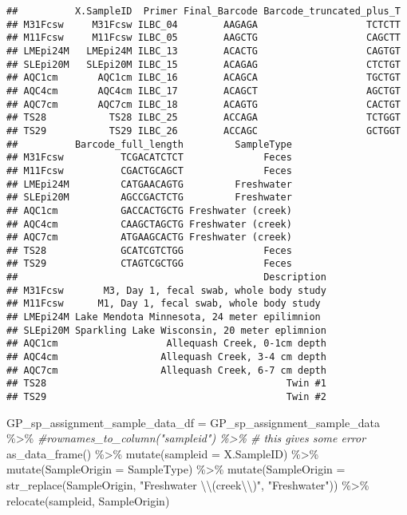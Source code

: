 \documentclass[
]{article}
\newenvironment{Shaded}{\begin{snugshade}}{\end{snugshade}}
\newcommand{\AttributeTok}[1]{\textcolor[rgb]{0.77,0.63,0.00}{#1}}
\newcommand{\CommentTok}[1]{\textcolor[rgb]{0.56,0.35,0.01}{\textit{#1}}}
\newcommand{\FunctionTok}[1]{\textcolor[rgb]{0.00,0.00,0.00}{#1}}
\newcommand{\NormalTok}[1]{#1}
\newcommand{\OtherTok}[1]{\textcolor[rgb]{0.56,0.35,0.01}{#1}}
\newcommand{\SpecialCharTok}[1]{\textcolor[rgb]{0.00,0.00,0.00}{#1}}
\newcommand{\StringTok}[1]{\textcolor[rgb]{0.31,0.60,0.02}{#1}}
\begin{document}
\begin{verbatim}
##          X.SampleID  Primer Final_Barcode Barcode_truncated_plus_T
## M31Fcsw     M31Fcsw ILBC_04        AAGAGA                   TCTCTT
## M11Fcsw     M11Fcsw ILBC_05        AAGCTG                   CAGCTT
## LMEpi24M   LMEpi24M ILBC_13        ACACTG                   CAGTGT
## SLEpi20M   SLEpi20M ILBC_15        ACAGAG                   CTCTGT
## AQC1cm       AQC1cm ILBC_16        ACAGCA                   TGCTGT
## AQC4cm       AQC4cm ILBC_17        ACAGCT                   AGCTGT
## AQC7cm       AQC7cm ILBC_18        ACAGTG                   CACTGT
## TS28           TS28 ILBC_25        ACCAGA                   TCTGGT
## TS29           TS29 ILBC_26        ACCAGC                   GCTGGT
##          Barcode_full_length         SampleType
## M31Fcsw          TCGACATCTCT              Feces
## M11Fcsw          CGACTGCAGCT              Feces
## LMEpi24M         CATGAACAGTG         Freshwater
## SLEpi20M         AGCCGACTCTG         Freshwater
## AQC1cm           GACCACTGCTG Freshwater (creek)
## AQC4cm           CAAGCTAGCTG Freshwater (creek)
## AQC7cm           ATGAAGCACTG Freshwater (creek)
## TS28             GCATCGTCTGG              Feces
## TS29             CTAGTCGCTGG              Feces
##                                           Description
## M31Fcsw       M3, Day 1, fecal swab, whole body study
## M11Fcsw      M1, Day 1, fecal swab, whole body study 
## LMEpi24M Lake Mendota Minnesota, 24 meter epilimnion 
## SLEpi20M Sparkling Lake Wisconsin, 20 meter eplimnion
## AQC1cm                   Allequash Creek, 0-1cm depth
## AQC4cm                  Allequash Creek, 3-4 cm depth
## AQC7cm                  Allequash Creek, 6-7 cm depth
## TS28                                          Twin #1
## TS29                                          Twin #2
\end{verbatim}

\begin{Shaded}
\begin{Highlighting}[]
\NormalTok{GP\_sp\_assignment\_sample\_data\_df }\OtherTok{=}\NormalTok{ GP\_sp\_assignment\_sample\_data }\SpecialCharTok{\%\textgreater{}\%}
  \CommentTok{\#rownames\_to\_column("sampleid")  \%\textgreater{}\% \# this gives some error}
  \FunctionTok{as\_data\_frame}\NormalTok{() }\SpecialCharTok{\%\textgreater{}\%}
 \FunctionTok{mutate}\NormalTok{(}\AttributeTok{sampleid =}\NormalTok{ X.SampleID) }\SpecialCharTok{\%\textgreater{}\%}
 \FunctionTok{mutate}\NormalTok{(}\AttributeTok{SampleOrigin =}\NormalTok{ SampleType) }\SpecialCharTok{\%\textgreater{}\%}
  \FunctionTok{mutate}\NormalTok{(}\AttributeTok{SampleOrigin =} \FunctionTok{str\_replace}\NormalTok{(SampleOrigin, }\StringTok{"Freshwater }\SpecialCharTok{\textbackslash{}\textbackslash{}}\StringTok{(creek}\SpecialCharTok{\textbackslash{}\textbackslash{}}\StringTok{)"}\NormalTok{, }\StringTok{"Freshwater"}\NormalTok{)) }\SpecialCharTok{\%\textgreater{}\%} 
  \FunctionTok{relocate}\NormalTok{(sampleid, SampleOrigin)}
\end{Highlighting}
\end{Shaded}
\end{document}

